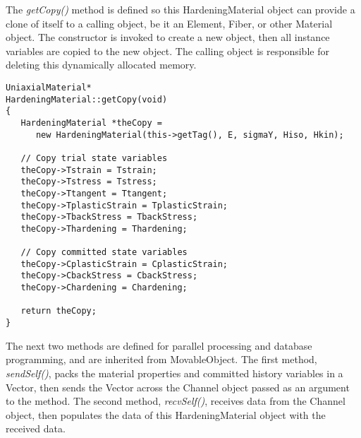 \documentclass[12pt]{article}
\begin{document}
\noindent The {\em getCopy()} method is defined so this HardeningMaterial object can
provide a clone of itself to a calling object, be it an Element, Fiber, or other
Material object. The constructor is invoked to create a new object, then all
instance variables are copied to the new object. The calling object is responsible
for deleting this dynamically allocated memory.

{\sf\small
\begin{verbatim}
UniaxialMaterial*
HardeningMaterial::getCopy(void)
{
   HardeningMaterial *theCopy = 
      new HardeningMaterial(this->getTag(), E, sigmaY, Hiso, Hkin);

   // Copy trial state variables
   theCopy->Tstrain = Tstrain;
   theCopy->Tstress = Tstress;
   theCopy->Ttangent = Ttangent;
   theCopy->TplasticStrain = TplasticStrain;
   theCopy->TbackStress = TbackStress;
   theCopy->Thardening = Thardening;
    
   // Copy committed state variables
   theCopy->CplasticStrain = CplasticStrain;
   theCopy->CbackStress = CbackStress;
   theCopy->Chardening = Chardening;
    
   return theCopy;
}
\end{verbatim}
}

\noindent The next two methods are defined for parallel processing and database programming,
and are inherited from MovableObject.
The first method, {\em sendSelf()}, packs the material properties and committed history variables
in a Vector, then sends the Vector across the Channel object passed as an argument to the
method. The second method, {\em recvSelf()}, receives data from the Channel object, then populates
the data of this HardeningMaterial object with the received data.
\end{document}
